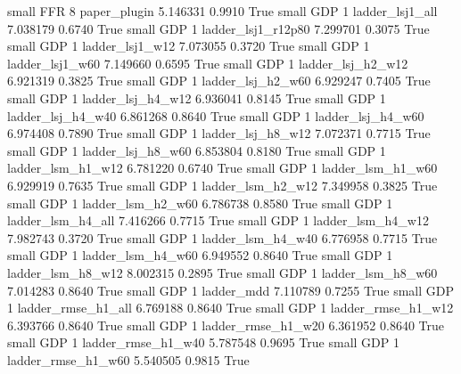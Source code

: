      small      FFR                 8             paper_plugin   5.146331      0.9910    True
     small      GDP                 1          ladder_lsj1_all   7.038179      0.6740    True
     small      GDP                 1       ladder_lsj1_r12p80   7.299701      0.3075    True
     small      GDP                 1          ladder_lsj1_w12   7.073055      0.3720    True
     small      GDP                 1          ladder_lsj1_w60   7.149660      0.6595    True
     small      GDP                 1        ladder_lsj_h2_w12   6.921319      0.3825    True
     small      GDP                 1        ladder_lsj_h2_w60   6.929247      0.7405    True
     small      GDP                 1        ladder_lsj_h4_w12   6.936041      0.8145    True
     small      GDP                 1        ladder_lsj_h4_w40   6.861268      0.8640    True
     small      GDP                 1        ladder_lsj_h4_w60   6.974408      0.7890    True
     small      GDP                 1        ladder_lsj_h8_w12   7.072371      0.7715    True
     small      GDP                 1        ladder_lsj_h8_w60   6.853804      0.8180    True
     small      GDP                 1        ladder_lsm_h1_w12   6.781220      0.6740    True
     small      GDP                 1        ladder_lsm_h1_w60   6.929919      0.7635    True
     small      GDP                 1        ladder_lsm_h2_w12   7.349958      0.3825    True
     small      GDP                 1        ladder_lsm_h2_w60   6.786738      0.8580    True
     small      GDP                 1        ladder_lsm_h4_all   7.416266      0.7715    True
     small      GDP                 1        ladder_lsm_h4_w12   7.982743      0.3720    True
     small      GDP                 1        ladder_lsm_h4_w40   6.776958      0.7715    True
     small      GDP                 1        ladder_lsm_h4_w60   6.949552      0.8640    True
     small      GDP                 1        ladder_lsm_h8_w12   8.002315      0.2895    True
     small      GDP                 1        ladder_lsm_h8_w60   7.014283      0.8640    True
     small      GDP                 1               ladder_mdd   7.110789      0.7255    True
     small      GDP                 1       ladder_rmse_h1_all   6.769188      0.8640    True
     small      GDP                 1       ladder_rmse_h1_w12   6.393766      0.8640    True
     small      GDP                 1       ladder_rmse_h1_w20   6.361952      0.8640    True
     small      GDP                 1       ladder_rmse_h1_w40   5.787548      0.9695    True
     small      GDP                 1       ladder_rmse_h1_w60   5.540505      0.9815    True

